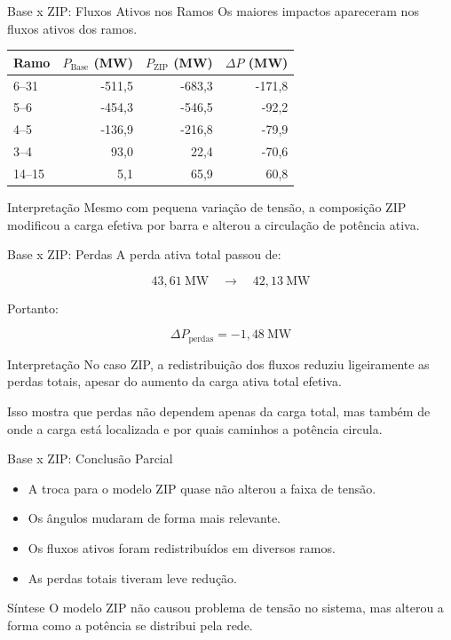\documentclass[aspectratio=169,11pt]{beamer}
\begin{document}
\begin{frame}{Base x ZIP: Fluxos Ativos nos Ramos}
  Os maiores impactos apareceram nos fluxos ativos dos ramos.

  \begin{table}
    \centering
    \small
    \begin{tabular}{lrrr}
      \toprule
      Ramo & $P_{\text{Base}}$ (MW) & $P_{\text{ZIP}}$ (MW) & $\Delta P$ (MW) \\
      \midrule
      6--31 & -511,5 & -683,3 & -171,8 \\
      5--6 & -454,3 & -546,5 & -92,2 \\
      4--5 & -136,9 & -216,8 & -79,9 \\
      3--4 & 93,0 & 22,4 & -70,6 \\
      14--15 & 5,1 & 65,9 & 60,8 \\
      \bottomrule
    \end{tabular}
  \end{table}

  \begin{block}{Interpretação}
    Mesmo com pequena variação de tensão, a composição ZIP modificou a carga efetiva por barra e alterou a circulação de potência ativa.
  \end{block}
\end{frame}

\begin{frame}{Base x ZIP: Perdas}
  A perda ativa total passou de:

  \[
    43{,}61\ \text{MW} \quad \rightarrow \quad 42{,}13\ \text{MW}
  \]

  Portanto:

  \[
    \Delta P_{\text{perdas}} = -1{,}48\ \text{MW}
  \]

  \begin{block}{Interpretação}
    No caso ZIP, a redistribuição dos fluxos reduziu ligeiramente as perdas totais, apesar do aumento da carga ativa total efetiva.
  \end{block}

  \vspace{0.15cm}
  Isso mostra que perdas não dependem apenas da carga total, mas também de onde a carga está localizada e por quais caminhos a potência circula.
\end{frame}

\begin{frame}{Base x ZIP: Conclusão Parcial}
  \begin{itemize}
    \item A troca para o modelo ZIP quase não alterou a faixa de tensão.
    \item Os ângulos mudaram de forma mais relevante.
    \item Os fluxos ativos foram redistribuídos em diversos ramos.
    \item As perdas totais tiveram leve redução.
  \end{itemize}

  \begin{block}{Síntese}
    O modelo ZIP não causou problema de tensão no sistema, mas alterou a forma como a potência se distribui pela rede.
  \end{block}
\end{frame}
\end{document}
